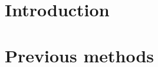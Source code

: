 \documentclass[titlepage, a4paper,12pt,draft]{article}
\begin{document}





\tableofcontents
\newpage

\section{Introduction}


\section{Previous methods}

\end{document}
